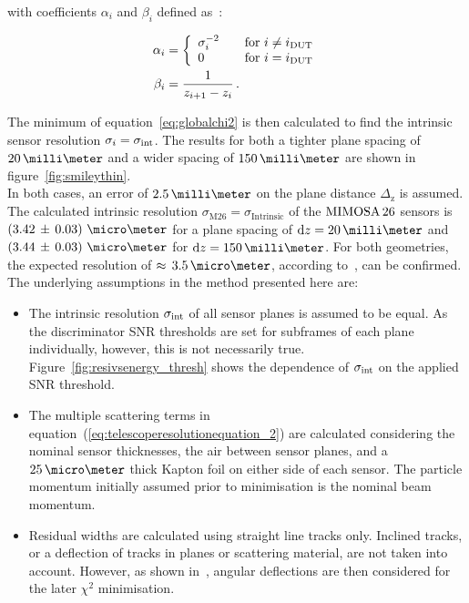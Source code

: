 with coefficients $\alpha_i$ and $\beta_i$ defined as~\cite{ref:eudetreport200701}:

\begin{equation}
\begin{aligned}
\alpha_i &= \left\{
  \begin{array}{l l}
    \sigma_{i}^{-2} & \quad \text{for $i \neq i_{\textrm{DUT}}$}\\
    0 & \quad \text{for $i = i_{\textrm{DUT}}$}
  \end{array} \right. \\
\beta_i &= \frac{1}{z_{i + 1} - z_i} \,.
\end{aligned}
\end{equation}

The minimum of equation~\ref{eq:globalchi2} is then calculated to find the intrinsic sensor resolution $\sigma_i = \sigma_{\textrm{int}}$.
The results for both a tighter plane spacing of $20\,\milli\meter$ and a wider spacing of $150\,\milli\meter$ are shown in figure~\ref{fig:smileythin}.\\

In both cases, an error of $2.5\,\milli\meter$ on the plane distance $\Delta_\textrm{z}$ is assumed.
The calculated intrinsic resolution $\sigma_{\textrm{M26}} = \sigma_{\textrm{Intrinsic}}$ of the $\textrm{MIMOSA\,26}$ sensors is \allowbreak$\left( 3.42\,\pm\, \allowbreak 0.03 \right)\,\micro\meter$ for a plane spacing of $\textrm{d}z =  20\,\milli\meter$ and $\left( 3.44\,\pm\, \allowbreak 0.03 \right)\,\micro\meter$ for $\textrm{d}z = 150\,\milli\meter$.
For both geometries, the expected resolution of $\approx\,3.5\,\micro\meter$, according to~\cite{ref:mimosa26}, can be confirmed.
The underlying assumptions in the method presented here are:\\

\begin{itemize}
\item The intrinsic resolution $\sigma_{\textrm{int}}$ of all sensor planes is assumed to be equal.
As the discriminator SNR thresholds are set for subframes of each plane individually, however, this is not necessarily true.
Figure~\ref{fig:resivsenergy_thresh} shows the dependence of $\sigma_{\textrm{int}}$ on the applied SNR threshold.

\item The multiple scattering terms in equation~(\ref{eq:telescoperesolutionequation_2}) are calculated considering the nominal sensor thicknesses, the air between sensor planes, and a $25\,\micro\meter$
thick Kapton foil on either side of each sensor.
The particle momentum initially assumed prior to minimisation is the nominal beam momentum.

\item Residual widths are calculated using straight line tracks only.
Inclined tracks, or a deflection of tracks in planes or scattering material, are not taken into account.
However, as shown in~\cite{ref:lutzpaper}, angular deflections are then considered for the later $\chi^2$ minimisation.
\end{itemize}


